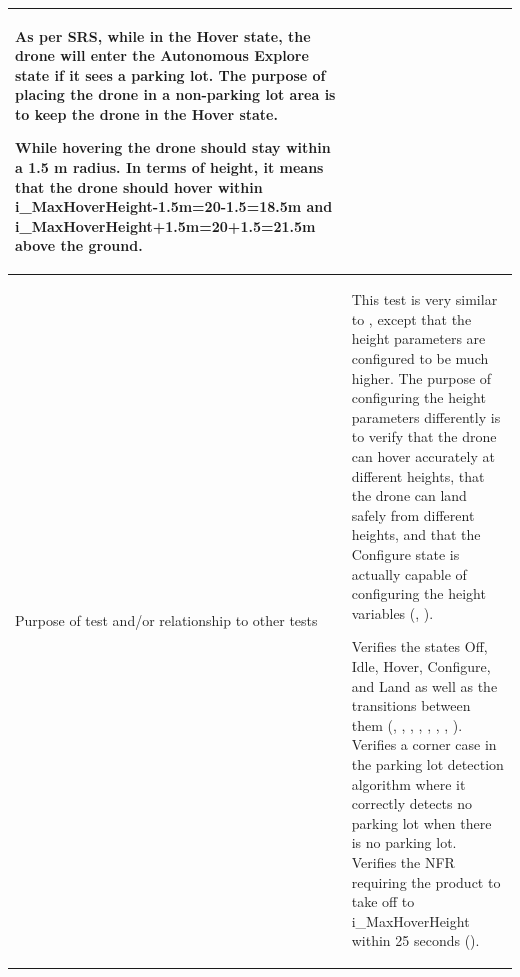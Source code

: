 \documentclass[12pt, titlepage]{article}
\begin{document}
\begin{table}[!h]
\begin{center}
\begin{tabular}{ | m{1.5cm} | m{15cm} | }
As per SRS, while in the Hover state, the drone will enter the Autonomous Explore state if it sees a parking lot. The purpose of placing the drone in a non-parking lot area is to keep the drone in the Hover state.

While hovering the drone should stay within a 1.5 m radius. In terms of height, it means that the drone should hover within i\_MaxHoverHeight-1.5m=20-1.5=18.5m and i\_MaxHoverHeight+1.5m=20+1.5=21.5m above the ground.  \\ 
\hline
Purpose of test and/or relationship to other tests & This test is very similar to \nameref{tab:STC_001}, except that the height parameters are configured to be much higher. The purpose of configuring the height parameters differently is to verify that the drone can hover accurately at different heights, that the drone can land safely from different heights, and that the Configure state is actually capable of configuring the height variables (\nameref{GEN_003}, \nameref{GEN_004}).

Verifies the states Off, Idle, Hover, Configure, and Land as well as the transitions between them (\nameref{STA_000}, \nameref{STA_001}, \nameref{STA_004}, \nameref{STA_005}, \nameref{STA_006}, \nameref{TRANS_002}, \nameref{TRANS_003}, \nameref{TRANS_009}). 
Verifies a corner case in the parking lot detection algorithm where it correctly detects no parking lot when there is no parking lot.
Verifies the NFR requiring the product to take off to i\_MaxHoverHeight within 25 seconds (\nameref{PERF_002}). \\ 
\hline
\end{tabular}
\end{center}
\end{table}
\end{document}
